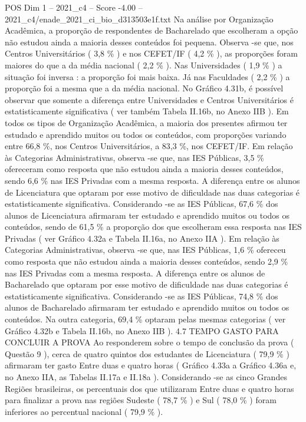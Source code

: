 \begin{textsample}{POS Dim 1 – 2021\_c4 – Score -4.00 – 2021\_c4/enade\_2021\_ci\_bio\_d313503e1f.txt}
Na análise por Organização Acadêmica, a proporção de respondentes de Bacharelado que escolheram a opção não estudou ainda a maioria desses conteúdos foi pequena.
Observa -se que, nos Centros Universitários ( 3,8 \% ) e nos CEFET/IF ( 4,2 \% ), as proporções foram maiores do que a da média nacional ( 2,2 \% ).
Nas Universidades ( 1,9 \% ) a situação foi inversa : a proporção foi mais baixa.
Já nas Faculdades ( 2,2 \% ) a proporção foi a mesma que a da média nacional.
No Gráfico 4.31b, é possível observar que somente a diferença entre Universidades e Centros Universitários é estatisticamente significativa ( ver também Tabela II.16b, no Anexo IIB ).
Em todos os tipos de Organização Acadêmica, a maioria dos presentes afirmou ter estudado e aprendido muitos ou todos os conteúdos, com proporções variando entre 66,8 \%, nos Centros Universitários, a 83,3 \%, nos CEFET/IF.
Em relação às Categorias Administrativas, observa -se que, nas IES Públicas, 3,5 \% ofereceram como resposta que não estudou ainda a maioria desses conteúdos, sendo 6,6 \% nas IES Privadas com a mesma resposta.
A diferença entre os alunos de Licenciatura que optaram por esse motivo de dificuldade nas duas categorias é estatisticamente significativa.
Considerando -se as IES Públicas, 67,6 \% dos alunos de Licenciatura afirmaram ter estudado e aprendido muitos ou todos os conteúdos, sendo de 61,5 \% a proporção dos que escolheram essa resposta nas IES Privadas ( ver Gráfico 4.32a e Tabela II.16a, no Anexo IIA ).
Em relação às Categorias Administrativas, observa -se que, nas IES Públicas, 1,6 \% ofereceu como resposta que não estudou ainda a maioria desses conteúdos, sendo 2,9 \% nas IES Privadas com a mesma resposta.
A diferença entre os alunos de Bacharelado que optaram por esse motivo de dificuldade nas duas categorias é estatisticamente significativa.
Considerando -se as IES Públicas, 74,8 \% dos alunos de Bacharelado afirmaram ter estudado e aprendido muitos ou todos os conteúdos.
Na outra categoria, 69,4 \% optaram pelas mesmas categorias ( ver Gráfico 4.32b e Tabela II.16b, no Anexo IIB ). 4.7 TEMPO GASTO PARA CONCLUIR A PROVA Ao responderem sobre o tempo de conclusão da prova ( Questão 9 ), cerca de quatro quintos dos estudantes de Licenciatura ( 79,9 \% ) afirmaram ter gasto Entre duas e quatro horas ( Gráfico 4.33a a Gráfico 4.36a e, no Anexo IIA, as Tabelas II.17a e II.18a ).
Considerando -se as cinco Grandes Regiões brasileiras, os percentuais dos que utilizaram Entre duas e quatro horas para finalizar a prova nas regiões Sudeste ( 78,7 \% ) e Sul ( 78,0 \% ) foram inferiores ao percentual nacional ( 79,9 \% ).

\end{textsample}
